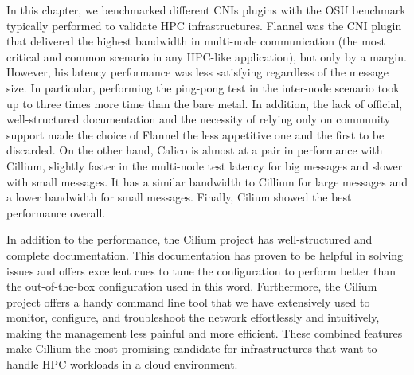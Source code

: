 In this chapter, we benchmarked different CNIs plugins with the OSU benchmark
typically performed to validate HPC infrastructures. Flannel was the CNI plugin
that delivered the highest bandwidth in multi-node communication (the most
critical and common scenario in any HPC-like application), but only by a margin.
However, his latency performance was less satisfying regardless of the message
size. In particular, performing the ping-pong test in the inter-node scenario
took up to three times more time than the bare metal. In addition, the lack of
official, well-structured documentation and the necessity of relying only on
community support made the choice of Flannel the less appetitive one and the
first to be discarded. On the other hand, Calico is almost at a pair in
performance with Cillium, slightly faster in the multi-node test latency for big
messages and slower with small messages. It has a similar bandwidth to Cillium
for large messages and a lower bandwidth for small messages. Finally, Cilium
showed the best performance overall. 

In addition to the performance, the Cilium project has well-structured and
complete documentation. This documentation has proven to be helpful in solving
issues and offers excellent cues to tune the configuration to perform better
than the out-of-the-box configuration used in this word. Furthermore, the Cilium
project offers a handy command line tool that we have extensively used to
monitor, configure, and troubleshoot the network effortlessly and intuitively,
making the management less painful and more efficient. These combined features
make Cillium the most promising candidate for infrastructures that want to
handle HPC workloads in a cloud environment.


